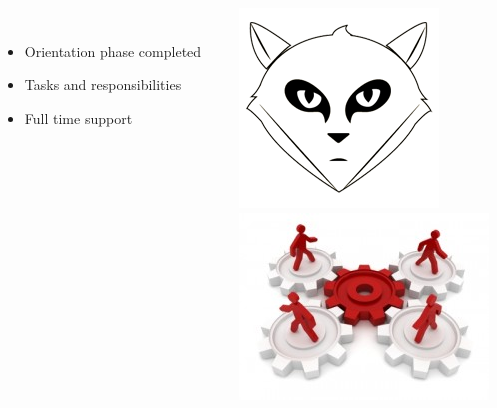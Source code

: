 \begin{frame}
\begin{columns}
\begin{column}{0.8\textwidth}
\begin{description}[]
        \bigskip
        \item[New Colleagues] \hfill \\
        \begin{itemize}
          \item Orientation phase completed
          \item Tasks and responsibilities
          \item Full time support
        \end{itemize}
      \end{description}
    \end{column}
    \begin{column}{0.2\textwidth}
   	  \includegraphics[width=.9\textwidth]{images/gitlab.png}\\
      \vspace*{2cm}
      \includegraphics[width=\textwidth]{images/teamwork.jpg}
    \end{column}
  \end{columns}
\end{frame}


